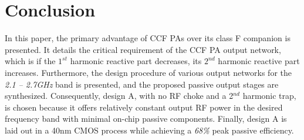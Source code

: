 \documentclass[conference]{IEEEtran}
\begin{document}
\section{Conclusion}
\label{section:Conclusion}
 In this paper, the primary advantage of CCF PAs over its class F companion is presented. It details the critical requirement of the CCF PA output network, which is if the $1^{st}$ harmonic reactive part decreases, its $2^{nd}$ harmonic reactive part increases. Furthermore, the design procedure of various output networks for the \textit{2.1 -- 2.7GHz} band is presented, and the proposed passive output stages are synthesized.  Consequently, design A, with no RF choke and a 2$^{nd}$ harmonic trap, is chosen because it offers relatively constant output RF power in the desired frequency band with minimal on-chip passive components. Finally, design A is laid out in a 40nm CMOS process while achieving a \textit{68\%} peak passive efficiency.



\end{document}
